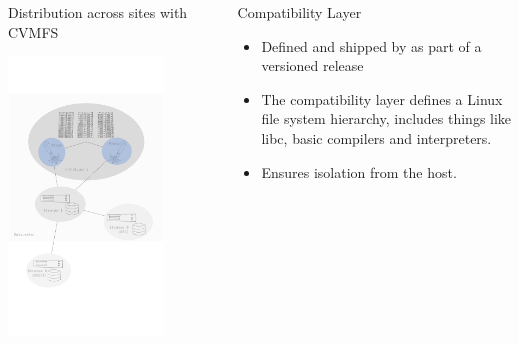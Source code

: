 \documentclass[final]{beamer}
\begin{document}
\begin{frame}[t]
\begin{columns}[t]
\begin{column}{0.48\textwidth}
    \begin{block}{Distribution across sites with CVMFS}
      \begin{center}
        \includegraphics[width=0.75\textwidth]{./include/main_cvmfs.pdf}
      \end{center}
    \end{block}
  \end{column}



  \begin{column}{0.48\textwidth}

      \begin{block}{Compatibility Layer}
          \begin{itemize}
           \item Defined and shipped by \eessi{} as part of a versioned release
           \item The compatibility layer defines a Linux file system hierarchy,
               includes things like libc, basic compilers and interpreters.
           \item Ensures isolation from the host.
          \end{itemize}
      \end{block}


\end{column}
\end{columns}
\end{frame}
\end{document}
